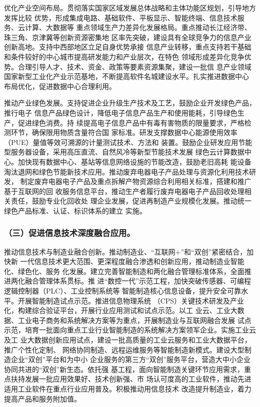 \documentclass[11pt]{ctexart}
\begin{document}
{{{{优化产业空间布局。贯彻落实国家区域发展总体战略和主体功能区规划，引导地方发挥比较
优势，形成集成电路、基础软件、平板显示、智能终端、信息技术服务、云计算、大数据等
重点领域生产力差异化发展格局。重点推动长江经济带、珠三角、京津冀等创新资源密集地
区率先突破，建设具有全球竞争力的信息产业创新高地。支持中西部地区立足自身优势承接
信息产业转移，重点支持若干基础和条件较好的中心城市提高研发能力和产业层次，在特色
领域形成差异化竞争优势。合理引导人才、技术、资金、政策等要素资源集聚，建设一批信
息产业领域国家新型工业化产业示范基地，不断提高软件名城建设水平。扎实推进数据中心
布局优化，促进数据中心合理利用。

推动产业绿色发展。支持促进企业升级生产技术及工艺，鼓励企业开发绿色产品，推行电子
信息产品绿色设计，降低电子信息产品生产和使用能耗，引导绿色生产，促进绿色消费。持
续提高电子信息产品中有毒有害物质的限量要求，严格检测环节，确保限用物质含量符合国
家标准。研发支撑数据中心能源使用效率（PUE）量值等效可溯源的计量测试技术、方法和
装置。鼓励企业研发应用节能型服务器设备，采用高压直流、自然风冷等新型节能技术发展
绿色云计算数据中心。加快现有数据中心、基站等信息网络设施的节能改造，鼓励老旧高耗
能设备淘汰退网和绿色节能新技术应用。推动废弃电器电子产品处理与资源化利用技术研发，
制定废弃电器电子产品及重点拆解产物资源综合利用相关标准，搭建和推广基于互联网的回
收服务信息平台，推动生产者履行废弃电器电子产品回收处理相关责任，鼓励专业化回收处
理企业发展，促进再制造产业规模化发展。推动统一绿色产品标准、认证、标识体系的建立
实施。

\subsubsection{（三）促进信息技术深度融合应用。}
\label{sec:org4201fe3}

推动信息技术与制造业融合创新。推动制造业、“互联网+”和“双创”紧密结合，加快新
一代信息技术更大范围、更深程度融合渗透和创新应用，推动制造业智能化、绿色化、服务
化发展。建立完善智能制造和两化融合管理标准体系，全面推进两化融合管理体系贯标。推
进“数控一代”示范工程，加快突破传感器、可编程逻辑控制器（PLC）、工业控制系统等
智能制造核心信息设备，提升安全可靠水平。开展智能制造试点示范。推进信息物理系统
（CPS）关键技术研发及产业化，构建综合验证平台，开展行业应用测试和试点示范。以工
业云、工业大数据、工业电子商务和系统解决方案等为重点，开展制造业与互联网融合发展
试点示范，培育一批面向重点工业行业智能制造的系统解决方案领军企业。实施工业云及工
业大数据创新应用试点，建设一批高质量的工业云服务和工业大数据平台，推广个性化定制、
网络协同制造、远程运维服务等智能制造新模式。建设大型制造企业“双创”平台和为中小
企业服务的第三方“双创”服务平台，营造大中小企业协同共进的“双创”新生态。依托强
基工程，面向智能制造关键环节应用需求，重点扶持发展一批应用效果好、技术创新强、市
场认可度高的工业软件，推动先进适用工业软件在重点行业应用普及。积极推动用信息技术
改造提升制造业，着力提高产品和服务附加值。

}}}}
\end{document}
